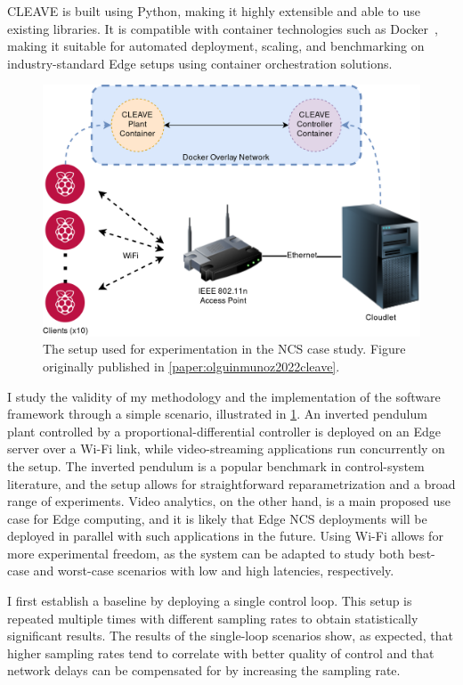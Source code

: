 \gls{CLEAVE} is built using Python, making it highly extensible and able to use existing libraries.
It is compatible with container technologies such as Docker~\cite{docker}, making it suitable for automated deployment, scaling, and benchmarking on industry-standard Edge setups using container orchestration solutions.

\begin{figure}
    \centering
    \includegraphics[width=.9\textwidth]{publications/2022CLEAVE/images/CLEAVE_experiment_setup}
    \caption{
        The setup used for experimentation in the \gls{NCS} case study.
        Figure originally published in \cref{paper:olguinmunoz2022cleave}.
    }\label{fig:cleavesetup}
\end{figure}

\medskip
I study the validity of my methodology and the implementation of the software framework through a simple scenario, illustrated in \cref{fig:cleavesetup}.
An inverted pendulum plant controlled by a proportional-differential controller is deployed on an Edge server over a Wi-Fi link, while video-streaming applications run concurrently on the setup.
The inverted pendulum is a popular benchmark in control-system literature, and the setup allows for straightforward reparametrization and a broad range of experiments.
Video analytics, on the other hand, is a main proposed use case for Edge computing, and it is likely that Edge \gls{NCS} deployments will be deployed in parallel with such applications in the future.
Using Wi-Fi allows for more experimental freedom, as the system can be adapted to study both best-case and worst-case scenarios with low and high latencies, respectively.

I first establish a baseline by deploying a single control loop.
This setup is repeated multiple times with different sampling rates to obtain statistically significant results.
The results of the single-loop scenarios show, as expected, that higher sampling rates tend to correlate with better quality of control and that network delays can be compensated for by increasing the sampling rate.

